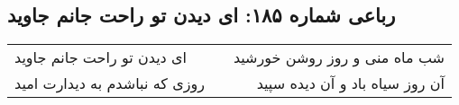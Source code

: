 \begin{center}
\section*{رباعی شماره ۱۸۵: ای دیدن تو راحت جانم جاوید}
\label{sec:sh185}
\begin{longtable}{l p{0.5cm} r}
ای دیدن تو راحت جانم جاوید
&&
شب ماه منی و روز روشن خورشید
\\
روزی که نباشدم به دیدارت امید
&&
آن روز سیاه باد و آن دیده سپید
\\
\end{longtable}
\end{center}
